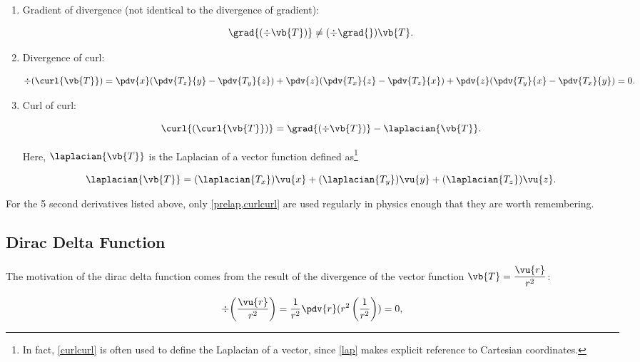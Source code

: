 \documentclass[english,a4paper,12pt]{report}
\begin{document}
\begin{enumerate}
	\item Gradient of divergence (not identical to the divergence of gradient):
		
	\begin{equation} 
		\grad{(\div{\vb{T}})} \neq (\div{\grad{} } )\vb{T}. 
	\end{equation}
		
	\item Divergence of curl:
		
	\begin{equation} 
		\div{(\curl{\vb{T}})} = \pdv{x}(\pdv{T_z}{y} - \pdv{T_y}{z}) + \pdv{z}(\pdv{T_x}{z} - \pdv{T_z}{x}) + \pdv{z}(\pdv{T_y}{x} - \pdv{T_x}{y}) = 0. \label{divcurl} 
	\end{equation}
		
	\item Curl of curl:
		
	\begin{equation} 
		\curl{(\curl{\vb{T}})} = \grad{(\div{\vb{T}})} - \laplacian{\vb{T}}. \label{curlcurl} 
	\end{equation} 
		
	Here, \(\laplacian{\vb{T}}\) is the Laplacian of a vector function defined as\footnote{In fact, \cref{curlcurl} is often used to define the Laplacian of a vector, since \cref{lap} makes explicit reference to Cartesian coordinates.}
		
	\begin{equation} 
		\laplacian{\vb{T}} = (\laplacian{T_x})\vu{x} + (\laplacian{T_y})\vu{y} + (\laplacian{T_z})\vu{z}. 
	\end{equation}	
\end{enumerate}	
	
For the 5 second derivatives listed above, only \cref{prelap,curlcurl} are used regularly in physics enough that they are worth remembering.
	
\subsection{Dirac Delta Function}
	
The motivation of the dirac delta function comes from the result of the divergence of the vector function \(\displaystyle \vb{T} = \frac{\vu{r}}{r^2}\):
	
\begin{equation} 
	\div{\left(\frac{\vu{r}}{r^2}\right)} = \frac{1}{r^2} \pdv{r}(r^2\left(\frac{1}{r^2}\right)) = 0, \label{notmatchone} 
\end{equation}
	
\end{document}
